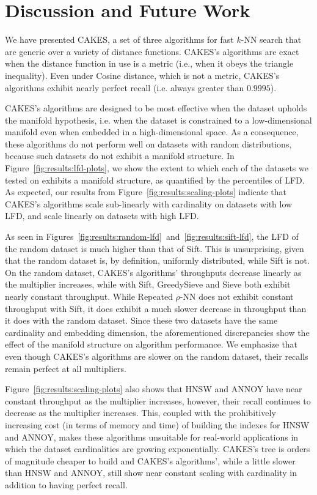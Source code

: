 \section{Discussion and Future Work}
\label{sec:discussion}

We have presented CAKES, a set of three algorithms for fast $k$-NN search that are generic over a variety of distance functions.
CAKES's algorithms are exact when the distance function in use is a metric (i.e., when it obeys the triangle inequality).
Even under Cosine distance, which is not a metric, CAKES's algorithms exhibit nearly perfect recall (i.e. always greater than $0.9995$).

CAKES's algorithms are designed to be most effective when the dataset upholds the manifold hypothesis, i.e. when the dataset is constrained to a low-dimensional manifold even when embedded in a high-dimensional space.
As a consequence, these algorithms do not perform well on datasets with random distributions, because such datasets do not exhibit a manifold structure.
In Figure~\ref{fig:results:lfd-plots}, we show the extent to which each of the datasets we tested on exhibits a manifold structure, as quantified by the percentiles of LFD.
As expected, our results from Figure~\ref{fig:results:scaling-plots} indicate that CAKES's algorithms scale sub-linearly with cardinality on datasets with low LFD, and scale linearly on datasets with high LFD.

As seen in Figures~\ref{fig:results:random-lfd}~and~\ref{fig:results:sift-lfd}, the LFD of the random dataset is much higher than that of Sift.
This is unsurprising, given that the random dataset is, by definition, uniformly distributed, while Sift is not.
On the random dataset, CAKES's algorithms' throughputs decrease linearly as the multiplier increases, while with Sift, GreedySieve and Sieve both exhibit nearly constant throughput.
While Repeated $\rho$-NN does not exhibit constant throughput with Sift, it does exhibit a much slower decrease in throughput than it does with the random dataset.
Since these two datasets have the same cardinality and embedding dimension, the aforementioned discrepancies show the effect of the manifold structure on algorithm performance.
We emphasize that even though CAKES's algorithms are slower on the random dataset, their recalls remain perfect at all multipliers.

Figure~\ref{fig:results:scaling-plots} also shows that HNSW and ANNOY have near constant throughput as the multiplier increases, however, their recall continues to decrease as the multiplier increases.
This, coupled with the prohibitively increasing cost (in terms of memory and time) of building the indexes for HNSW and ANNOY, makes these algorithms unsuitable for real-world applications in which the dataset cardinalities are growing exponentially.
CAKES's tree is orders of magnitude cheaper to build and CAKES's algorithms', while a little slower than HNSW and ANNOY, still show near constant scaling with cardinality in addition to having perfect recall.

